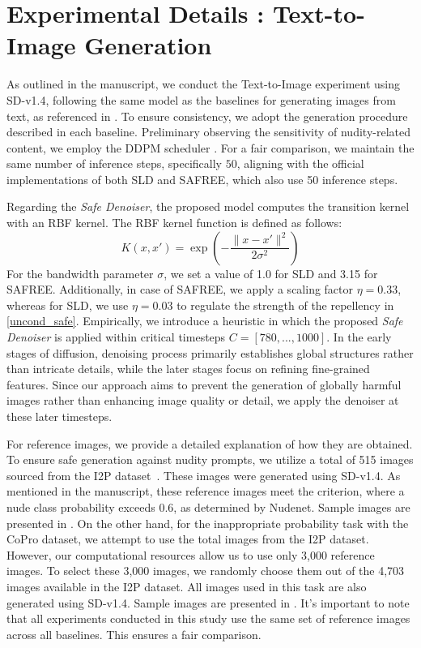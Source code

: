 \section{Experimental Details : Text-to-Image Generation}
\label{sec:t2i_detail}

As outlined in the manuscript, we conduct the Text-to-Image experiment using SD-v1.4, following the same model as the baselines for generating images from text, as referenced in \cite{schramowski2023safe, wu2024erasediff, gong2024reliable, yoon2024safree}. 
To ensure consistency, we adopt the generation procedure described in each baseline. 
Preliminary observing the sensitivity of nudity-related content, we employ the DDPM scheduler \cite{ho2020denoising}. %
For a fair comparison, we maintain the same number of inference steps, specifically $50$, aligning with the official implementations of both SLD and SAFREE, which also use 50 inference steps.

Regarding the \textit{Safe Denoiser}, the proposed model computes the transition kernel with an RBF kernel. 
%
%
The RBF kernel function is defined as follows:
\begin{equation}
\label{eq_rbf_kernel}
K(x, x') = \exp\left(-\frac{\lVert x - x'\rVert^2}{2\sigma^2}\right)
\end{equation}
For the bandwidth parameter $\sigma$, we set a value of 1.0 for SLD and 3.15 for SAFREE. 
Additionally, in case of SAFREE, we apply a scaling factor $\eta=0.33$, whereas for SLD, we use $\eta=0.03$ to regulate the strength of the repellency in \eqref{uncond_safe}.
Empirically, we introduce a heuristic in which the proposed \textit{Safe Denoiser} is applied within critical timesteps $C=[780, ...,1000]$. %
In the early stages of diffusion, denoising process primarily establishes global structures rather than intricate details, while the later stages focus on refining fine-grained features. 
Since our approach aims to prevent the generation of globally harmful images rather than enhancing image quality or detail, we apply the denoiser at these later timesteps. 

For reference images, we provide a detailed explanation of how they are obtained. 
To ensure safe generation against nudity prompts, we utilize a total of 515 images sourced from the I2P dataset~\cite{schramowski2023safe}. 
These images were generated using SD-v1.4. As mentioned in the manuscript, these reference images meet the criterion, where a nude class probability exceeds 0.6, as determined by Nudenet. 
Sample images are presented in . 
On the other hand, for the inappropriate probability task with the CoPro dataset, we attempt to use the total images from the I2P dataset. However, our computational resources allow us to use only 3,000 reference images.
To select these 3,000 images, we randomly choose them out of the 4,703 images available in the I2P dataset. All images used in this task are also generated using SD-v1.4.
Sample images are presented in . 
It’s important to note that all experiments conducted in this study use the same set of reference images across all baselines. This ensures a fair comparison.

